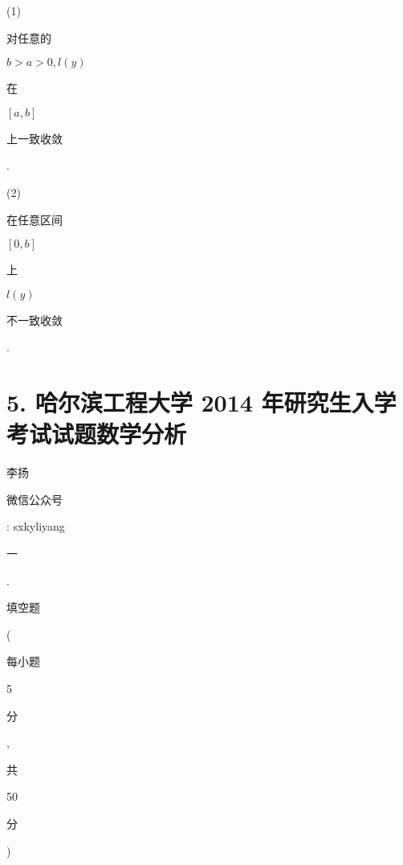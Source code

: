 \documentclass[10pt]{article}
\begin{document}
(1) \begin{CJK}{UTF8}{mj}对任意的\end{CJK} $b>a>0, l(y)$ \begin{CJK}{UTF8}{mj}在\end{CJK} $[a, b]$ \begin{CJK}{UTF8}{mj}上一致收敛\end{CJK}.

(2) \begin{CJK}{UTF8}{mj}在任意区间\end{CJK} $[0, b]$ \begin{CJK}{UTF8}{mj}上\end{CJK} $l(y)$ \begin{CJK}{UTF8}{mj}不一致收敛\end{CJK}.

\section{5. 哈尔滨工程大学 2014 年研究生入学考试试题数学分析}
\begin{CJK}{UTF8}{mj}李扬\end{CJK}

\begin{CJK}{UTF8}{mj}微信公众号\end{CJK}: sxkyliyang

\begin{CJK}{UTF8}{mj}一\end{CJK}. \begin{CJK}{UTF8}{mj}填空题\end{CJK} (\begin{CJK}{UTF8}{mj}每小题\end{CJK} 5 \begin{CJK}{UTF8}{mj}分\end{CJK}, \begin{CJK}{UTF8}{mj}共\end{CJK} 50 \begin{CJK}{UTF8}{mj}分\end{CJK})
\end{document}
